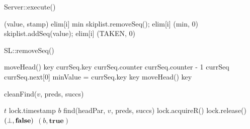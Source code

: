 \begin{algorithm}[htb]
	\caption{Server::execute()}
	\label{alg:Execute}
	\begin{algorithmic}[1]
		\State (value, stamp) \attr elim[i]
		\State min \attr skiplist.removeSeq(); elim[i] \attr (min, 0)
		\EndIf
		\EndIf
		\State skiplist.addSeq(value); elim[i] \attr (TAKEN, 0)
		\EndIf    
		\EndIf
		\EndFor
		\EndWhile
	\end{algorithmic}
\end{algorithm}

\begin{algorithm}[!htb]
	\caption{SL::removeSeq()}
	\label{alg:RemoveSeq}
	\begin{algorithmic}[1]
		\State \Return \maxInt
		\EndIf
		\State moveHead()
		\EndIf
		\State key \attr currSeq.key
		\State currSeq.counter \attr currSeq.counter - 1
		\State currSeq \attr currSeq.next[0]
		\State minValue = currSeq.key
		\State \Return key
		\EndIf
		\EndWhile
		\State moveHead()
		\EndIf
		\State \Return key
	\end{algorithmic}
\end{algorithm}

\begin{algorithm}[!htb]
	\caption{cleanFind($v$, preds, succs)}
	\label{alg:CleanFind}
	\begin{algorithmic}[1]
		\State $t$ \attr lock.timestamp \label{algFLT:checkstamp1}
		\State $b$ \attr find(headPar, $v$, preds, succs)
		\State lock.acquireR()
		 \label{algFLT:checkstamp2}
		\State lock.release()
		\State \Return $(\bot, \mathbf{false})$
		\EndIf
		\State \Return $(b, \mathbf{true})$
	\end{algorithmic}
\end{algorithm}

